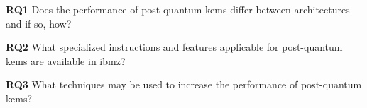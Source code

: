 \begin{description}
    \item \textbf{RQ1} Does the performance of \gls{post-quantum} \glspl{kem} differ between architectures and if so, how?\label{rq1}
    
    \item \textbf{RQ2} What specialized instructions and features applicable for \gls{post-quantum} \glspl{kem} are available in \gls{ibmz}?\label{rq2}
    
    \item \textbf{RQ3} What techniques may be used to increase the performance of \gls{post-quantum} \glspl{kem}?\label{rq3}
\end{description}

